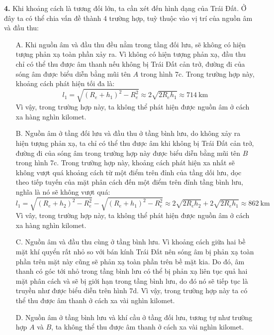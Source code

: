 \noindent \textbf{4.} Khi khoảng cách là tương đối lớn, ta cần xét đến hình dạng của Trái Đất. Ở đây ta có thể chia vấn đề thành 4 trường hợp, tuỳ thuộc vào vị trí của nguồn âm và đầu thu:
\begin{enumerate}
  \item[A.] Khi nguồn âm và đầu thu đều nằm trong tầng đối lưu, sẽ không có hiện tượng phản xạ toàn phần xảy ra. Vì không có hiện tượng phản xạ, đầu thu chỉ có thể thu được âm thanh nếu không bị Trái Đất cản trở, đường đi của sóng âm được biểu diễn bằng mũi tên $A$ trong hình 7c. Trong trường hợp này, khoảng cách phát hiện tối đa là:
        \begin{equation*}
          l_{1}=\sqrt{(R_{e}+h_{1})^{2}-R_{e}^{2}}\approx2\sqrt{2R_{e}h_{1}}\approx\SI{714}{\kilo\metre}
        \end{equation*}
        Vì vậy, trong trường hợp này, ta không thể phát hiện được nguồn âm ở cách xa hàng nghìn kilomet.
  \item[B.] Nguồn âm ở tầng đối lưu và đầu thu ở tầng bình lưu, do không xảy ra hiện tượng phản xạ, ta chỉ có thể thu được âm khi không bị Trái Đất cản trở, đường đi của sóng âm trong trường hợp này được biểu diễn bằng mũi tên $B$ trong hình 7c. Trong trường hợp này, khoảng cách phát hiện xa nhất sẽ không vượt quá khoảng cách từ một điểm trên đỉnh của tầng dối lưu, dọc theo tiếp tuyến của mặt phân cách đến một điểm trên đỉnh tầng bình lưu, nghĩa là nó sẽ không vượt quá:
        \begin{equation*}
          l_{1}=\sqrt{(R_{e}+h_{2})^{2}-R_{e}^{2}}-\sqrt{(R_{e}+h_{1})^{2}-R_{e}^{2}}\approx2\sqrt{2R_{e}h_{2}} + 2\sqrt{2R_{e}h_{1}}\approx\SI{862}{\kilo\metre}
        \end{equation*}
        Vì vây, trong trường hợp này, ta không thể phát hiện được nguồn âm ở cách xa hàng nghìn kilomet.
  \item[C.] Nguồn âm và đầu thu cùng ở tầng bình lưu. Vì khoảng cách giữa hai bề mặt khí quyển rất nhỏ so với bán kính Trái Đất nên sóng âm bị phản xạ toàn phần trên mặt này cũng sẽ phản xạ toàn phần trên bề mặt kia. Do đó, âm thanh có góc tới nhỏ trong tầng bình lưu có thể bị phản xạ liên tục quả hai mặt phân cách và sẽ bị giới hạn trong tầng bình lưu, do đó nó sẽ tiếp tục là truyền như được biểu diễn trên hình 7d. Vì vậy, trong trường hợp này ta có thể thu được âm thanh ở cách xa vài nghìn kilomet.
  \item[D.] Nguồn âm ở tầng bình lưu và khí cầu ở tầng đối lưu, tương tự như trường hợp $A$ và $B$, ta không thể thu được âm thanh ở cách xa vài nghìn kilomet.
\end{enumerate}

